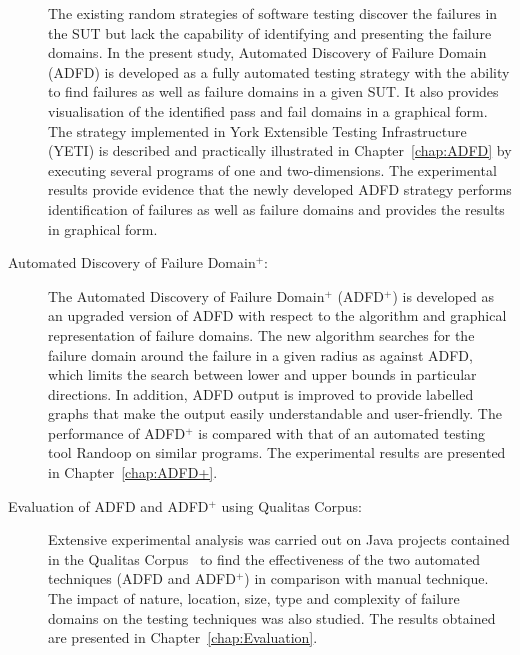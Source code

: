 \begin{description}
The existing random strategies of software testing discover the failures in the SUT but lack the capability of identifying and presenting the failure domains. In the present study, Automated Discovery of Failure Domain (ADFD) is developed as a fully automated testing strategy with the ability to find failures as well as failure domains in a given SUT. It also provides visualisation of the identified pass and fail domains in a graphical form. The strategy implemented in York Extensible Testing Infrastructure (YETI) is described and practically illustrated in Chapter~\ref{chap:ADFD} by executing several programs of one and two-dimensions. The experimental results provide evidence that the newly developed ADFD strategy performs identification of failures as well as failure domains and provides the results in graphical form.\\

\item[Automated Discovery of Failure Domain$^+$:]

The Automated Discovery of Failure Domain$^+$ (ADFD$^+$) is developed as an upgraded version of ADFD with respect to the algorithm and graphical representation of failure domains. The new algorithm searches for the failure domain around the failure in a given radius as against ADFD, which limits the search between lower and upper bounds in particular directions. In addition, ADFD output is improved to provide labelled graphs that make the output easily understandable and user-friendly. The performance of ADFD$^+$ is compared with that of an automated testing tool Randoop on similar programs. 
The experimental results are presented in Chapter~\ref{chap:ADFD+}.\\

\bigskip




\item[Evaluation of ADFD and ADFD$^+$ using Qualitas Corpus:]

Extensive experimental analysis was carried out on Java projects contained in the Qualitas Corpus~\cite{tempero2010qualitas} to find the effectiveness of the two automated techniques (ADFD and ADFD$^+$) in comparison with manual technique. The impact of nature, location, size, type and complexity of failure domains on the testing techniques was also studied. The results obtained are presented in Chapter~\ref{chap:Evaluation}.\\


\end{description}
